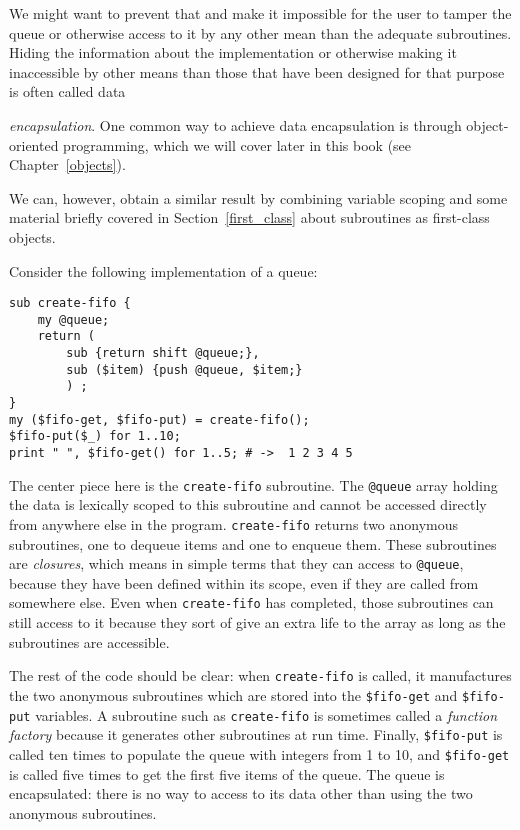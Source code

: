 We might want to prevent that and make it impossible for 
the user to tamper the queue or otherwise access to it by 
any other mean than the adequate subroutines. Hiding the 
information about the implementation or otherwise making 
it inaccessible by other means than those that have been 
designed for that purpose is often called data 
{\emph{encapsulation}. One common way to achieve data 
encapsulation is through object-oriented programming, which 
we will cover later in this book (see Chapter~\ref{objects}). 

We can, however, obtain 
a similar result by combining variable scoping and some 
material briefly covered in Section~\ref{first_class} about 
subroutines as first-class objects.

Consider the following implementation of a queue:
\begin{verbatim}
sub create-fifo {
    my @queue;
    return (
        sub {return shift @queue;}, 
        sub ($item) {push @queue, $item;}
        ) ;
}
my ($fifo-get, $fifo-put) = create-fifo();
$fifo-put($_) for 1..10;
print " ", $fifo-get() for 1..5; # ->  1 2 3 4 5
\end{verbatim}
%
The center piece here is the {\tt create-fifo} subroutine.
The \verb'@queue' array holding the data is lexically 
scoped to this subroutine and cannot be accessed directly 
from anywhere else in the program. {\tt create-fifo} returns 
two anonymous subroutines, one to dequeue items and one 
to enqueue them. These subroutines are \emph{closures}, 
which means in simple terms that they can access to 
\verb'@queue', because they have been defined within its 
scope, even if they are called from somewhere else. Even 
when {\tt create-fifo} has completed, those subroutines 
can still access to it because they sort of give an extra 
life to the array as long as the subroutines are accessible.

The rest of the code should be clear: when {\tt create-fifo} is 
called, it manufactures the two anonymous subroutines which 
are stored into the \verb'$fifo-get' and \verb'$fifo-put' 
variables. A subroutine such as {\tt create-fifo} is 
sometimes called a \emph{function factory} because it 
generates other subroutines at run time.
Finally, \verb'$fifo-put' is called ten times to 
populate the queue with integers from 1 to 10, and 
\verb'$fifo-get' is called five times to get the first five 
items of the queue. The queue is encapsulated: there is 
no way to access to its data other than using the two 
anonymous subroutines.

}
